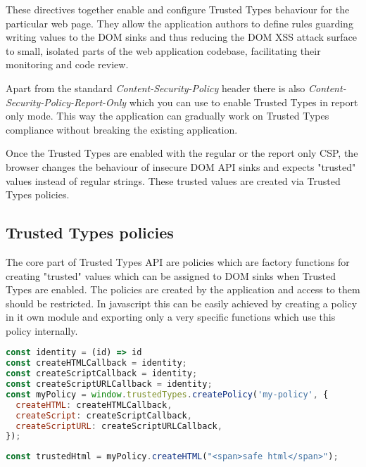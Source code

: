 These directives together enable and configure Trusted Types behaviour for the particular web page.
They allow the application authors to define rules guarding writing values to the DOM sinks and thus
reducing the DOM XSS attack surface to small, isolated parts of the web application codebase,
facilitating their monitoring and code review.

Apart from the standard \textit{Content-Security-Policy} header there is also
\textit{Content-Security-Policy-Report-Only} which you can use to enable Trusted Types in report
only mode. This way the application can gradually work on Trusted Types compliance without breaking
the existing application.

Once the Trusted Types are enabled with the regular or the report only CSP, the browser changes the
behaviour of insecure DOM API sinks and expects "trusted" values instead of regular strings. These
trusted values are created via Trusted Types policies.

\subsection{Trusted Types policies}
\label{subsec:tt_policy}

The core part of Trusted Types API are policies which are factory functions for creating "trusted"
values which can be assigned to DOM sinks when Trusted Types are enabled. The policies are created
by the application and access to them should be restricted. In javascript this can be easily
achieved by creating a policy in it own module and exporting only a very specific functions which
use this policy internally.

\bigskip
\begin{lstlisting}[language=JavaScript, caption=Creating Trusted Types policy, label={lst:create_tt_policy}]
const identity = (id) => id
const createHTMLCallback = identity;
const createScriptCallback = identity;
const createScriptURLCallback = identity;
const myPolicy = window.trustedTypes.createPolicy('my-policy', {
  createHTML: createHTMLCallback,
  createScript: createScriptCallback,
  createScriptURL: createScriptURLCallback,
});
\end{lstlisting}

\bigskip
\begin{lstlisting}[language=JavaScript, caption=Create trusted value using a policy]
const trustedHtml = myPolicy.createHTML("<span>safe html</span>");
\end{lstlisting}

